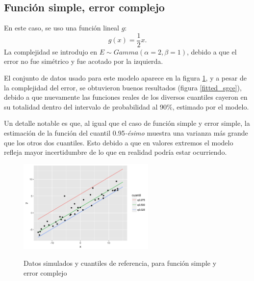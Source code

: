 \subsection{Funci\'on simple, error complejo}

En este caso, se uso una funci\'on lineal $g$:
\begin{equation*}
    g(x) = \frac{1}{2} x.
\end{equation*}
La complejidad se introdujo en $E \sim \textit{Gamma}(\alpha = 2,\beta = 1)$, debido a que el error no fue sim\'etrico y fue acotado por la izquierda. 

El conjunto de datos usado para este modelo aparece en la figura \ref{sample_sgce}, y a pesar de la complejidad del error, se obtuvieron buenos resultados (figura \ref{fitted_sgce}), debido a que nuevamente las funciones reales de los diversos cuantiles cayeron en su totalidad dentro del intervalo de probabilidad al 90\%, estimado por el modelo.

Un detalle notable es que, al igual que el caso de funci\'on simple y error simple, la estimaci\'on de la funci\'on del cuantil 0.95\textit{-\'esimo} muestra una varianza m\'as grande que los otros dos cuantiles. Esto debido a que en valores extremos el modelo refleja mayor incertidumbre de lo que en realidad podr\'ia estar ocurriendo.

\begin{figure}[H]
	\centering
	\caption{Datos simulados y cuantiles de referencia, para funci\'on simple y error complejo}
	\includegraphics[width=0.60\textwidth]{Figures/Simulation/simple_g_complex_error/sample.png}
	\label{sample_sgce}
\end{figure}

